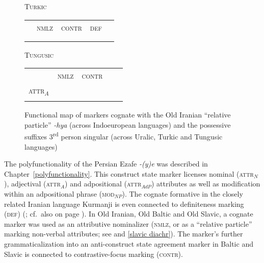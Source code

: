 {\begin{figure}[htbp]
\parbox[b]{0.5\textwidth}{
\begin{center}\textsc{Turkic}\\
\medskip
\begin{tabular}{| c || c | c | c | c}
\cline{1-1}
\\
\cline{1-1}
\\
\hline
 & \textsc{nmlz} & \textsc{contr} & \textsc{def}\\
\hline
\\
\cline{1-1}
\\
\cline{1-1}
\end{tabular}
\end{center}
}
\parbox[b]{0.5\textwidth}{
\begin{center}\textsc{Tungusic}\\
\medskip
\begin{tabular}{| c || c | c | c | c}
\cline{1-1}
\\
\cline{1-1}
\\
\hline
 & \textsc{nmlz} & \textsc{contr} & \\
\hline
\textsc{attr}$_{A}$\\
\cline{1-1}
\\
\cline{1-1}
\end{tabular}
\end{center}
}
\caption[Functional map of cognate devices]{Functional map of markers cognate with the Old Iranian “relative particle” \textit{-hya} (across Indoeuropean languages) and the possessive suffixes 3\textsuperscript{rd} person singular (across Uralic, Turkic and Tungusic languages)}
\label{ie-ural funcmap}
\end{figure}
The polyfunctionality of the Persian Ezafe \textit{-(y)e} was described in Chapter~\ref{polyfunctionality}. This construct state marker licenses nominal (\textsc{attr}$_{N}$), adjectival (\textsc{attr}$_{A}$) and adpositional (\textsc{attr}$_{AdP}$) attributes as well as modification within an adpositional phrase (\textsc{mod}$_{NP}$). The cognate formative in the closely related Iranian language Kurmanji is even connected to definiteness marking (\textsc{def}) (\citealt{schroder2002}; cf.~also  on page \pageref{ez kirmanji paradigm}). In Old Iranian, Old Baltic and Old Slavic, a cognate marker was used as an attributive nominalizer (\textsc{nmlz}, or as a “relative particle” marking non-verbal attributes; see  and \ref{slavic diachr}). The marker's further grammaticalization into an anti-construct state agreement marker in Baltic and Slavic is connected to contrastive-focus marking (\textsc{contr}).

}
